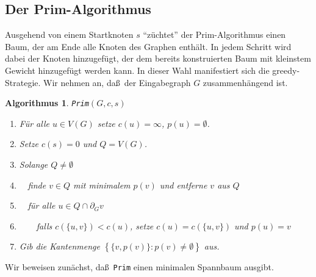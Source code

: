 \documentclass[10pt,reqno]{amsart}
\numberwithin{equation}{section}
\newtheorem{algorithm}[definition]{Algorithmus}
\newcommand\cbc[1]{\left\{{#1}\right\}}
\begin{document}
\subsection{Der Prim-Algorithmus}\label{sec_prim}
Ausgehend von einem Startknoten $s$ ``z\"uchtet'' der Prim-Algorithmus einen Baum, der am Ende alle Knoten des Graphen enth\"alt.
In jedem Schritt wird dabei der Knoten hinzugef\"ugt, der dem bereits konstruierten Baum mit kleinstem Gewicht hinzugef\"ugt werden kann.
In dieser Wahl manifestiert sich die greedy-Strategie.
Wir nehmen an, da\ss\ der Eingabegraph $G$ zusammenh\"angend ist.

\begin{algorithm}{\tt Prim}$(G,c,s)$
	\begin{enumerate}
		\item F\"ur alle $u\in V(G)$ setze $c(u)=\infty$, $p(u)=\emptyset$.
		\item Setze $c(s)=0$ und $Q=V(G)$.
		\item Solange $Q\neq\emptyset$
		\item $\quad$finde $v\in Q$ mit minimalem $p(v)$ und entferne $v$ aus $Q$
		\item $\quad$f\"ur alle $u\in Q\cap\partial_Gv$
		\item $\quad\quad$falls $c(\{u,v\})<c(u)$, setze $c(u)=c(\{u,v\})$ und $p(u)=v$
		\item Gib die Kantenmenge $\cbc{\{v,p(v)\}:p(v)\neq\emptyset}$ aus.
	\end{enumerate}
\end{algorithm}

Wir beweisen zun\"achst, da\ss\ {\tt Prim} einen minimalen Spannbaum ausgibt.
\end{document}

